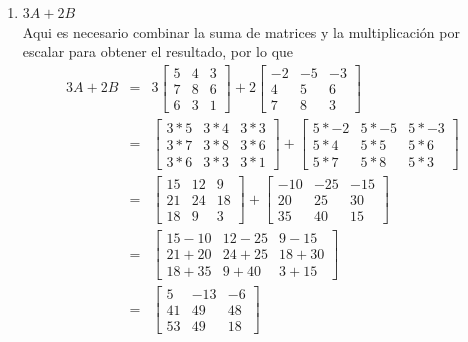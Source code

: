 \documentclass[12pt]{article}
\begin{document}
\begin{enumerate}
\begin{enumerate}
\begin{enumerate}
			\item $3A + 2B$ \\ Aqui es necesario combinar la suma de matrices y la multiplicaci\'on por escalar para obtener el resultado, por lo que
				\begin{eqnarray*}
					3A + 2B &=& 3\begin{bmatrix}
									5 & 4 & 3 \\
									7 & 8 & 6 \\
									6 & 3 & 1
								\end{bmatrix} + 2\begin{bmatrix}
									-2&-5 &-3 \\
									4 & 5 & 6 \\
									7 & 8 & 3
								\end{bmatrix} \\
					&=&	\begin{bmatrix}
							3*5 & 3*4 & 3*3 \\
							3*7 & 3*8 & 3*6 \\
							3*6 & 3*3 & 3*1
						\end{bmatrix} + \begin{bmatrix}
							5*-2& 5*-5& 5*-3 \\
							5*4 & 5*5 & 5*6 \\
							5*7 & 5*8 & 5*3
						\end{bmatrix} \\
					&=& \begin{bmatrix}
							15 & 12 &  9 \\
							21 & 24 & 18 \\
							18 &  9 &  3
						\end{bmatrix} + \begin{bmatrix}
							-10 &-25 &-15 \\
							 20 & 25 & 30 \\
							 35 & 40 & 15
						\end{bmatrix} \\
					&=& \begin{bmatrix}
							15-10 & 12-25 &  9-15 \\
							21+20 & 24+25 & 18+30 \\
							18+35 &  9+40 &  3+15
						\end{bmatrix} \\
					&=& \begin{bmatrix}
							 5 &-13 & -6 \\
							41 & 49 & 48 \\
							53 & 49 & 18
						\end{bmatrix}
				\end{eqnarray*}
		\end{enumerate}
	\end{enumerate}


\end{enumerate}
\end{document}
